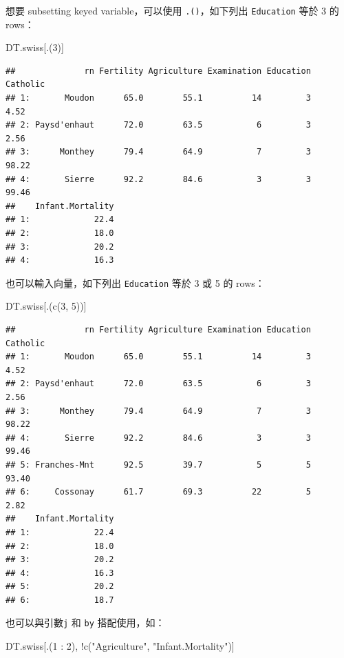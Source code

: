 \documentclass[
]{book}
\newenvironment{Shaded}{\begin{snugshade}}{\end{snugshade}}
\newcommand{\DecValTok}[1]{\textcolor[rgb]{0.00,0.00,0.81}{#1}}
\newcommand{\FunctionTok}[1]{\textcolor[rgb]{0.00,0.00,0.00}{#1}}
\newcommand{\NormalTok}[1]{#1}
\newcommand{\SpecialCharTok}[1]{\textcolor[rgb]{0.00,0.00,0.00}{#1}}
\newcommand{\StringTok}[1]{\textcolor[rgb]{0.31,0.60,0.02}{#1}}
\theoremstyle{definition}
\theoremstyle{remark}
\begin{document}
想要 subsetting keyed variable，可以使用 \texttt{.()}，如下列出 \texttt{Education} 等於 3 的 rows：

\begin{Shaded}
\begin{Highlighting}[]
\NormalTok{DT.swiss[.(}\DecValTok{3}\NormalTok{)]}
\end{Highlighting}
\end{Shaded}

\begin{verbatim}
##              rn Fertility Agriculture Examination Education Catholic
## 1:       Moudon      65.0        55.1          14         3     4.52
## 2: Paysd'enhaut      72.0        63.5           6         3     2.56
## 3:      Monthey      79.4        64.9           7         3    98.22
## 4:       Sierre      92.2        84.6           3         3    99.46
##    Infant.Mortality
## 1:             22.4
## 2:             18.0
## 3:             20.2
## 4:             16.3
\end{verbatim}

也可以輸入向量，如下列出 \texttt{Education} 等於 3 或 5 的 rows：

\begin{Shaded}
\begin{Highlighting}[]
\NormalTok{DT.swiss[.(}\FunctionTok{c}\NormalTok{(}\DecValTok{3}\NormalTok{, }\DecValTok{5}\NormalTok{))]}
\end{Highlighting}
\end{Shaded}

\begin{verbatim}
##              rn Fertility Agriculture Examination Education Catholic
## 1:       Moudon      65.0        55.1          14         3     4.52
## 2: Paysd'enhaut      72.0        63.5           6         3     2.56
## 3:      Monthey      79.4        64.9           7         3    98.22
## 4:       Sierre      92.2        84.6           3         3    99.46
## 5: Franches-Mnt      92.5        39.7           5         5    93.40
## 6:     Cossonay      61.7        69.3          22         5     2.82
##    Infant.Mortality
## 1:             22.4
## 2:             18.0
## 3:             20.2
## 4:             16.3
## 5:             20.2
## 6:             18.7
\end{verbatim}

也可以與引數\texttt{j} 和 \texttt{by} 搭配使用，如：

\begin{Shaded}
\begin{Highlighting}[]
\NormalTok{DT.swiss[.(}\DecValTok{1} \SpecialCharTok{:} \DecValTok{2}\NormalTok{), }\SpecialCharTok{!}\FunctionTok{c}\NormalTok{(}\StringTok{"Agriculture"}\NormalTok{, }\StringTok{"Infant.Mortality"}\NormalTok{)]}
\end{Highlighting}
\end{Shaded}
\end{document}
